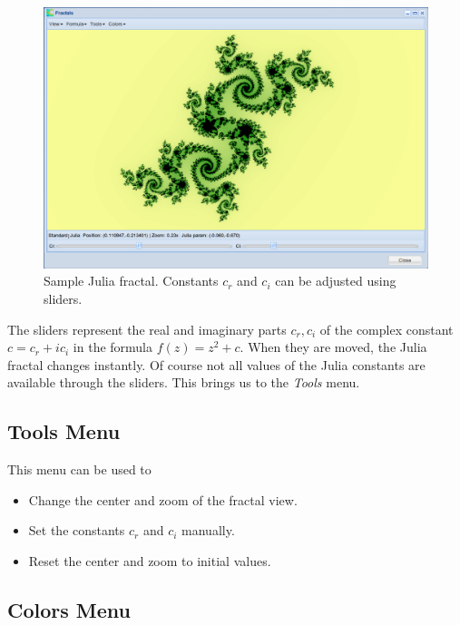 \documentclass[article,A4,12pt]{llncs}
\begin{document}
\begin{figure}[!ht]
\begin{center}
\includegraphics[width=\textwidth]{img/julia-1.png}
\end{center}
\caption{Sample Julia fractal. Constants $c_r$ and $c_i$ can be adjusted using sliders.}
\label{fig:jul-1}
\end{figure}

\noindent
The sliders represent the real and imaginary parts $c_r, c_i$ of the complex constant 
$c = c_r + i c_i$ in the formula $f(z) = z^2 + c$. When they are moved, the Julia 
fractal changes instantly. Of course not all values of the Julia constants are 
available through the sliders. This brings us to the {\em Tools} menu.

\subsection*{Tools Menu}

This menu can be used to

\begin{itemize} 
\item Change the center and zoom of the fractal view. 
\item Set the constants $c_r$ and $c_i$ manually.
\item Reset the center and zoom to initial values.
\end{itemize}

\subsection*{Colors Menu}
\end{document}
